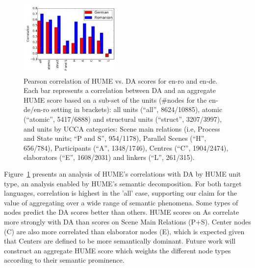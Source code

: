 \documentclass[11pt,letterpaper]{article}
\begin{document}
\begin{figure}[t]
\includegraphics[width=0.45\textwidth]{humevsDAcorrtypes-10en-dero.pdf}
\caption{Pearson correlation of HUME vs. DA scores for en-ro and en-de.
Each bar represents a correlation between DA and an aggregate HUME score
based on a sub-set of the units (\#nodes for the en-de/en-ro setting in brackets):
all units (``all'', 8624/10885), atomic (``atomic'', 5417/6888)
and structural units (``struct'', 3207/3997),
and units by UCCA categories: Scene main relations
(i.e, Process and State units; ``P and S'', 954/1178), Parallel Scenes (``H'', 656/784),
Participants (``A'', 1348/1746),
Centres (``C'', 1904/2474), elaborators (``E'', 1608/2031) and linkers (``L'', 261/315).
\label{fig:dacorrelationtypes}}
\end{figure}


Figure~\ref{fig:dacorrelationtypes} presents an analysis of HUME's correlations with DA by HUME unit type,
an analysis enabled by HUME's semantic decomposition. 
For both target languages, correlation is highest in the 'all' case, supporting our claim for the value of aggregating over a wide range of semantic phenomena. Some types of nodes predict the DA scores better than others. HUME scores on As correlate more strongly with DA than scores on Scene Main Relations (P+S). Center nodes (C) are also more correlated than elaborator nodes (E), which is expected given that Centers are defined to be more semantically dominant. Future work will construct an aggregate HUME score which weights the different node types according to their semantic prominence. 
\end{document}
